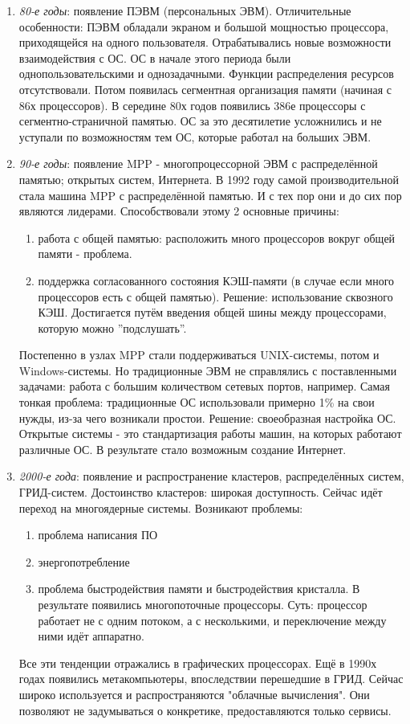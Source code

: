 \documentclass[a4paper,12pt]{article}
\begin{document}
	\begin{enumerate}
		\item {\em 80-е годы}: появление ПЭВМ (персональных ЭВМ). Отличительные особенности: 
		ПЭВМ обладали экраном и большой мощностью процессора, приходящейся на одного 
		пользователя. Отрабатывались новые возможности взаимодействия с ОС. ОС в начале этого 
		периода были однопользовательскими и однозадачными. Функции распределения ресурсов 
		отсутствовали. Потом появилась сегментная организация памяти (начиная с 86х 
		процессоров). В середине 80х годов появились 386е процессоры с сегментно-страничной 
		памятью. ОС за это десятилетие усложнились и не уступали по возможностям тем ОС, 
		которые работал на больших ЭВМ.
		\item {\em 90-е годы}: появление MPP - многопроцессорной ЭВМ с распределённой памятью; 
		открытых систем, Интернета. В 1992 году самой производительной стала машина MPP с 
		распределённой памятью. И с тех пор они и до сих пор являются лидерами. Способствовали 
		этому 2 основные причины:
		\begin{enumerate}
			\item работа с общей памятью: расположить много процессоров вокруг общей памяти - 
			проблема.
			\item поддержка согласованного состояния КЭШ-памяти (в случае если много 
			процессоров есть с общей памятью). Решение: использование сквозного КЭШ. Достигается 
			путём введения общей шины между процессорами, которую можно ''подслушать''.
		\end{enumerate}
		Постепенно в узлах MPP стали поддерживаться UNIX-системы, потом и Windows-системы. Но
		традиционные ЭВМ не справлялись с поставленными задачами: работа с большим количеством 
		сетевых портов, например. Самая тонкая проблема: традиционные ОС использовали примерно 
		1\% на свои нужды, из-за чего возникали простои. Решение: своеобразная настройка ОС.
		Открытые системы - это стандартизация работы машин, на которых работают различные ОС. В
		результате стало возможным создание Интернет.
		\item {\em 2000-е года}: появление и распространение кластеров, распределённых систем, 
		ГРИД-систем.
		Достоинство кластеров: широкая доступность.
		Сейчас идёт переход на многоядерные системы. Возникают проблемы:
		\begin{enumerate}
			\item проблема написания ПО
			\item энергопотребление
			\item проблема быстродействия памяти и быстродействия кристалла. В результате 
			появились многопоточные процессоры. Суть: процессор работает не с одним потоком, а 
			с несколькими, и переключение между ними идёт аппаратно.
		\end{enumerate}
		Все эти тенденции отражались в графических процессорах.
		Ещё в 1990х годах появились метакомпьютеры, впоследствии перешедшие в ГРИД. Сейчас
		широко используется и распространяются "облачные вычисления". Они позволяют не 
		задумываться о конкретике, предоставляются только сервисы. 
	\end{enumerate}
\end{document}
